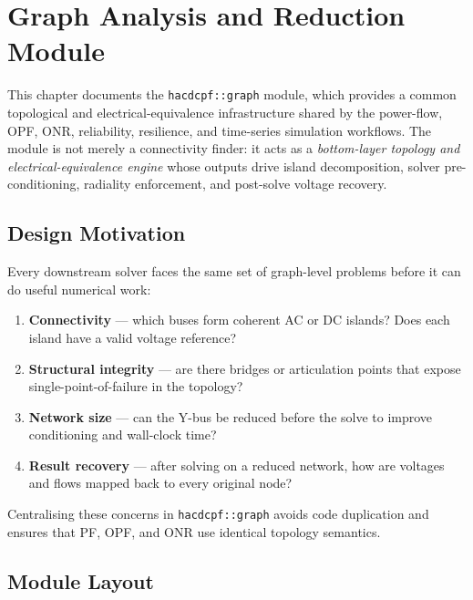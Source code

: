 \section{Graph Analysis and Reduction Module}
\label{sec:graph}

This chapter documents the \texttt{hacdcpf::graph} module, which provides a
common topological and electrical-equivalence infrastructure shared by the
power-flow, OPF, ONR, reliability, resilience, and time-series simulation
workflows.  The module is not merely a connectivity finder: it acts as a
\emph{bottom-layer topology and electrical-equivalence engine} whose outputs
drive island decomposition, solver pre-conditioning, radiality enforcement,
and post-solve voltage recovery.

\subsection{Design Motivation}
\label{sec:graph-motivation}

Every downstream solver faces the same set of graph-level problems before it
can do useful numerical work:

\begin{enumerate}
  \item \textbf{Connectivity} — which buses form coherent AC or DC islands?
        Does each island have a valid voltage reference?
  \item \textbf{Structural integrity} — are there bridges or articulation
        points that expose single-point-of-failure in the topology?
  \item \textbf{Network size} — can the Y-bus be reduced before the solve to
        improve conditioning and wall-clock time?
  \item \textbf{Result recovery} — after solving on a reduced network, how
        are voltages and flows mapped back to every original node?
\end{enumerate}

Centralising these concerns in \texttt{hacdcpf::graph} avoids code
duplication and ensures that PF, OPF, and ONR use identical topology
semantics.

\subsection{Module Layout}
\label{sec:graph-layout}

